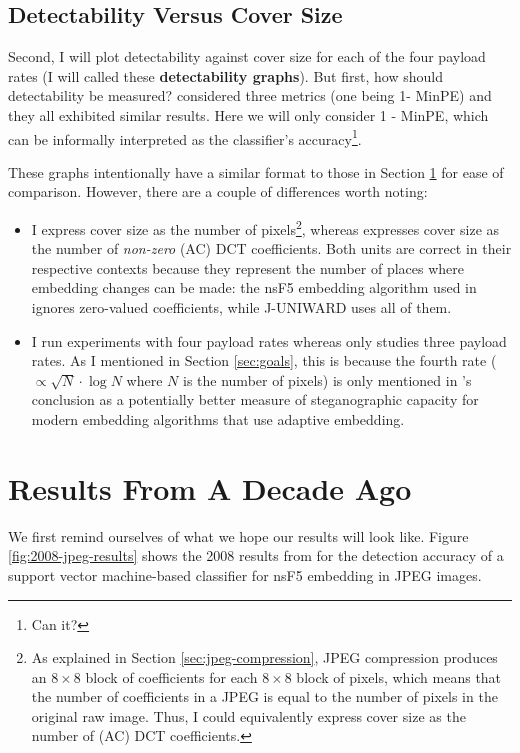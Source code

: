 \documentclass[11pt,a4paper,twoside,openright]{report}
\begin{document}
\subsection{Detectability Versus Cover Size}

Second, I will plot detectability against cover size for each of the four payload rates (I will called these \textbf{detectability graphs}). But first, how should detectability be measured? \cite{2008-paper} considered three metrics (one being 1- MinPE) and they all exhibited similar results. Here we will only consider 1 - MinPE, which can be informally interpreted as the classifier's accuracy\footnote{Can it?}.

These graphs intentionally have a similar format to those in Section \ref{sec:2008-results} for ease of comparison. However, there are a couple of differences worth noting:
\begin{itemize}
	\item I express cover size as the number of pixels\footnote{As explained in Section \ref{sec:jpeg-compression}, JPEG compression produces an $8\times8$ block of coefficients for each $8\times8$ block of pixels, which means that the number of coefficients in a JPEG is equal to the number of pixels in the original raw image. Thus, I could equivalently express cover size as the number of (AC) DCT coefficients.}, whereas \cite{2008-paper} expresses cover size as the number of \textit{non-zero} (AC) DCT coefficients. Both units are correct in their respective contexts because they represent the number of places where embedding changes can be made: the nsF5 embedding algorithm used in \cite{2008-paper} ignores zero-valued coefficients, while J-UNIWARD uses all of them.
	\item I run experiments with four payload rates whereas \cite{2008-paper} only studies three payload rates. As I mentioned in Section \ref{sec:goals}, this is because the fourth rate ($\propto \sqrt{N} \cdot \log{N}$ where $N$ is the number of pixels) is only mentioned in \cite{2008-paper}'s conclusion as a potentially better measure of steganographic capacity for modern embedding algorithms that use adaptive embedding.
\end{itemize}


\section{Results From A Decade Ago} \label{sec:2008-results}

We first remind ourselves of what we hope our results will look like. Figure \ref{fig:2008-jpeg-results} shows the 2008 results from \cite{2008-paper} for the detection accuracy of a support vector machine-based classifier for nsF5 embedding in JPEG images.
\end{document}
